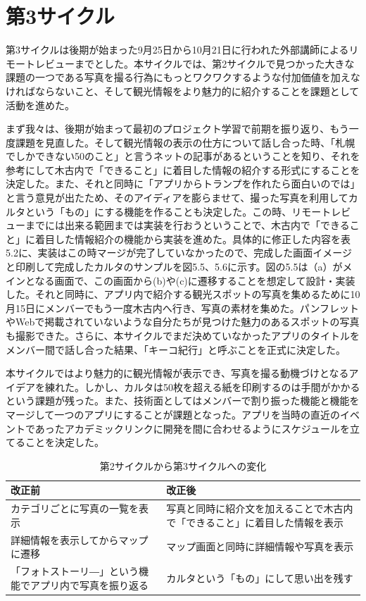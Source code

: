 \section{第3サイクル}
第3サイクルは後期が始まった9月25日から10月21日に行われた外部講師によるリモートレビューまでとした。本サイクルでは、第2サイクルで見つかった大きな課題の一つである写真を撮る行為にもっとワクワクするような付加価値を加えなければならないこと、そして観光情報をより魅力的に紹介することを課題として活動を進めた。
\par まず我々は、後期が始まって最初のプロジェクト学習で前期を振り返り、もう一度課題を見直した。そして観光情報の表示の仕方について話し合った時、「札幌でしかできない50のこと」と言うネットの記事があるということを知り、それを参考にして木古内で「できること」に着目した情報の紹介する形式にすることを決定した。また、それと同時に「アプリからトランプを作れたら面白いのでは」と言う意見が出たため、そのアイディアを膨らませて、撮った写真を利用してカルタという「もの」にする機能を作ることも決定した。この時、リモートレビューまでには出来る範囲までは実装を行おうということで、木古内で「できること」に着目した情報紹介の機能から実装を進めた。具体的に修正した内容を表5.2に、実装はこの時マージが完了していなかったので、完成した画面イメージと印刷して完成したカルタのサンプルを図5.5、5.6に示す。図の5.5は（a）がメインとなる画面で、この画面から(b)や(c)に遷移することを想定して設計・実装した。それと同時に、アプリ内で紹介する観光スポットの写真を集めるために10月15日にメンバーでもう一度木古内へ行き、写真の素材を集めた。パンフレットやWebで掲載されていないような自分たちが見つけた魅力のあるスポットの写真も撮影できた。さらに、本サイクルでまだ決めていなかったアプリのタイトルをメンバー間で話し合った結果、「キーコ紀行」と呼ぶことを正式に決定した。
\par 本サイクルではより魅力的に観光情報が表示でき、写真を撮る動機づけとなるアイデアを練れた。しかし、カルタは50枚を超える紙を印刷するのは手間がかかるという課題が残った。また、技術面としてはメンバーで割り振った機能と機能をマージして一つのアプリにすることが課題となった。アプリを当時の直近のイベントであったアカデミックリンクに開発を間に合わせるようにスケジュールを立てることを決定した。

\begin{table}[htb]
\centering
\addtocounter{table}{+0}
\caption{第2サイクルから第3サイクルへの変化}
  \begin{tabular}{|l|l|} \hline
    改正前&改正後  \\ \hline 
    カテゴリごとに写真の一覧を表示 & \parbox{20zw}{写真と同時に紹介文を加えることで木古内で「できること」に着目した情報を表示} \\  \hline
    詳細情報を表示してからマップに遷移 &\parbox{20zw}{マップ画面と同時に詳細情報や写真を表示}\\ \hline
    「フォトストーリ―」という機能でアプリ内で写真を振り返る & \parbox{20zw}{カルタという「もの」にして思い出を残す}\\ \hline
  \end{tabular} 
\end{table}

